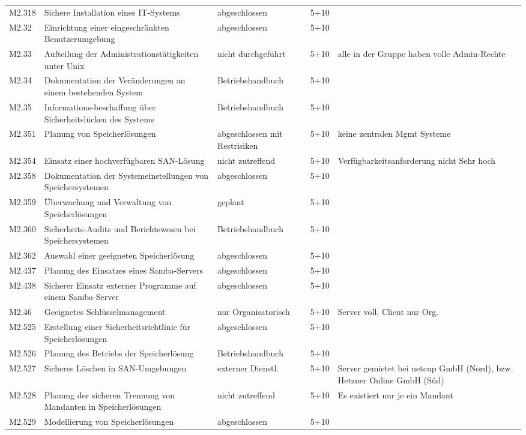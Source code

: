 \begin{longtable}{lp{3.7cm}|p{3cm}l|p{3.8cm}}
M2.318 & Sichere Installation eines IT-Systems & abgeschlossen & 5+10 &  \\
M2.32 & Einrichtung einer eingeschränkten Benutzerumgebung & abgeschlossen & 5+10 &  \\
M2.33 & Aufteilung der Administrationstätigkeiten unter Unix & nicht durchgeführt & 5+10 & alle in der Gruppe haben volle Admin-Rechte \\
M2.34 & Dokumentation der Veränderungen an einem bestehenden System & Betriebshandbuch & 5+10 &  \\
M2.35 & Informations-beschaffung über Sicherheitslücken des Systems & Betriebshandbuch & 5+10 &  \\
M2.351 & Planung von Speicherlösungen & abgeschlossen mit Restrisiken & 5+10 & keine zentralen Mgmt Systeme \\
M2.354 & Einsatz einer hochverfügbaren SAN-Lösung & nicht zutreffend & 5+10 & Verfügbarkeitsanforderung nicht Sehr hoch \\
M2.358 & Dokumentation der Systemeinstellungen von Speichersystemen & abgeschlossen & 5+10 &  \\
M2.359 & Überwachung und Verwaltung von Speicherlösungen & geplant & 5+10 &  \\
M2.360 & Sicherheits-Audits und Berichtswesen bei Speichersystemen & Betriebshandbuch & 5+10 &  \\
M2.362 & Auswahl einer geeigneten Speicherlösung & abgeschlossen & 5+10 &  \\
M2.437 & Planung des Einsatzes eines Samba-Servers & abgeschlossen & 5+10 &  \\
M2.438 & Sicherer Einsatz externer Programme auf einem Samba-Server & abgeschlossen & 5+10 &  \\
M2.46 & Geeignetes Schlüsselmanagement & nur Organisatorisch & 5+10 & Server voll, Client nur Org. \\
M2.525 & Erstellung einer Sicherheitsrichtlinie für Speicherlösungen & abgeschlossen & 5+10 &  \\
M2.526 & Planung des Betriebs der Speicherlösung & Betriebshandbuch & 5+10 &  \\
M2.527 & Sicheres Löschen in SAN-Umgebungen & externer Dienstl. & 5+10 & Server gemietet bei netcup GmbH (Nord), bzw. Hetzner Online GmbH (Süd) \\
M2.528 & Planung der sicheren Trennung von Mandanten in Speicherlösungen & nicht zutreffend & 5+10 & Es existiert nur je ein Mandant \\
M2.529 & Modellierung von Speicherlösungen & abgeschlossen & 5+10 &  \\

\end{longtable}
